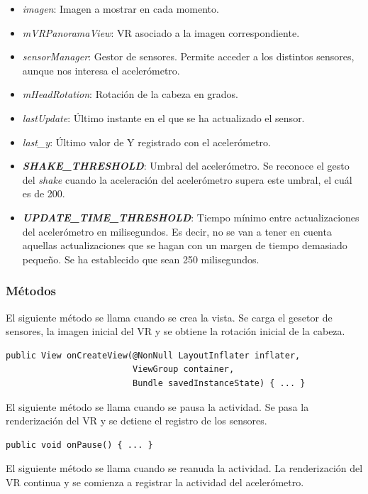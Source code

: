 \documentclass[11pt,a4paper]{article}
\begin{document}
\begin{itemize}
    \item \textit{imagen}: Imagen a mostrar en cada momento.
    \item \textit{mVRPanoramaView}: VR asociado a la imagen correspondiente.
    \item \textit{sensorManager}: Gestor de sensores. Permite acceder a los distintos sensores, aunque nos interesa el acelerómetro.
    \item \textit{mHeadRotation}: Rotación de la cabeza en grados.
    \item \textit{lastUpdate}: Último instante en el que se ha actualizado el sensor.
    \item \textit{last\_y}: Último valor de Y registrado con el acelerómetro.
    \item \textit{\textbf{SHAKE\_THRESHOLD}}: Umbral del acelerómetro. Se reconoce el gesto del \textit{shake} cuando la aceleración
    del acelerómetro supera este umbral, el cuál es de 200.
    \item \textit{\textbf{UPDATE\_TIME\_THRESHOLD}}: Tiempo mínimo entre actualizaciones del acelerómetro en milisegundos. Es decir,
    no se van a tener en cuenta aquellas actualizaciones que se hagan con un margen de tiempo demasiado pequeño. Se ha establecido
    que sean 250 milisegundos.
\end{itemize}

\subsubsection{Métodos}

El siguiente método se llama cuando se crea la vista. Se carga el gesetor de sensores, la imagen inicial del VR y se obtiene la rotación
inicial de la cabeza.

\begin{lstlisting}
public View onCreateView(@NonNull LayoutInflater inflater,
                         ViewGroup container,
                         Bundle savedInstanceState) { ... }
\end{lstlisting}

El siguiente método se llama cuando se pausa la actividad. Se pasa la renderización del VR y se detiene el registro de los sensores.

\begin{lstlisting}
public void onPause() { ... }
\end{lstlisting}

El siguiente método se llama cuando se reanuda la actividad. La renderización del VR continua y se comienza a registrar la actividad
del acelerómetro.
\end{document}
